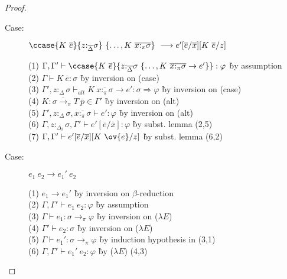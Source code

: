 \begin{proof}
\begin{description}
\item[Case:] $\ccase{K~\overline{e}}{z{:}_{\overline{\Delta}}\sigma}~\{\dots,K~\overline{x{:}_\pi\sigma}\}\ \longrightarrow e'[\overline{e}/\overline{x}][K~\overline{e}/z]$
\begin{tabbing}
(1) $\Gamma,\Gamma' \vdash \ccase{K~\overline{e}}{z{:}_{\overline{\Delta}}\sigma~\{\dots,K~\overline{x{:}_\pi\sigma}\to e'\}} : \varphi$ \` by assumption \\
(2) $\Gamma \vdash K~\overline{e} : \sigma$ \` by inversion on (case) \\
(3) $\Gamma', z{:}_\Delta\sigma \vdash_{alt} K~\overline{x{:}_\pi\sigma} \to e' : \sigma \Longrightarrow \varphi$ \` by inversion on (case) \\
(4) $K : \overline{\sigma \to_\pi} T~\overline{p} \in \Gamma'$ \` by inversion on (alt) \\
(5) $\Gamma',z{:}_\Delta\sigma,\overline{x{:}_\pi\sigma} \vdash e' : \varphi$ \` by inversion on (alt) \\
(6) $\Gamma, z{:}_{\Delta_i}\sigma, \Gamma' \vdash e'[\overline{e}/\overline{x}] : \varphi$ \` by subst. lemma (2,5) \\
(7) $\Gamma, \Gamma' \vdash e'[\overline{e}/\overline{x}][K~\ov{e}/z]$ \` by subst. lemma (6,2) \\
\end{tabbing}

\item[Case:] $e_1~e_2 \longrightarrow e_1'~e_2$
\begin{tabbing}
(1) $e_1 \longrightarrow e_1'$ \` by inversion on $\beta$-reduction \\
(2) $\Gamma,\Gamma' \vdash e_1~e_2 : \varphi$ \` by assumption \\
(3) $\Gamma \vdash e_1 : \sigma \to_\pi \varphi$ \` by inversion on ($\lambda E$) \\
(4) $\Gamma' \vdash e_2 : \sigma$ \` by inversion on ($\lambda E$) \\
(5) $\Gamma \vdash e_1' : \sigma \to_\pi \varphi$ \` by induction hypothesis in (3,1) \\
(6) $\Gamma, \Gamma' \vdash e_1'~e_2 : \varphi$ \` by ($\lambda E$) (4,3) \\
\end{tabbing}


\end{description}
\end{proof}
